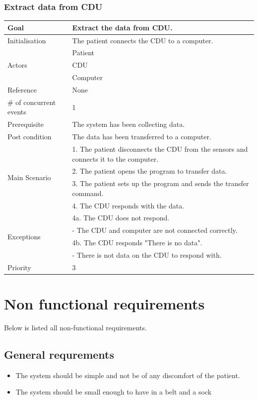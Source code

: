 \subsubsection{Extract data from CDU}
\begin{table}[H]
	\centering
	\begin{tabular}{|l|p{10cm}|}
	\hline
	Goal 							& Extract the data from CDU.\\ \hline
	Initialisation 					& The patient connects the CDU to a computer. \\ \hline
	\multirow{3}{*}{Actors} 		& Patient \\ 
									& CDU \\
									& Computer \\\hline
	Reference 						& None \\ \hline
	\# of concurrent events 		& 1 \\ \hline
	Prerequisite  					& The system has been collecting data.\\ \hline
	Post condition 					& The data has been transferred to a computer. \\ \hline
	\multirow{4}{*}{Main Scenario} 	& 1. The patient disconnects the CDU from the sensors and connects it to the computer. \\
									& 2. The patient opens the program to transfer data.\\
									& 3. The patient sets up the program and sends the transfer command.\\ 
									& 4. The CDU responds with the data. \\ \hline
	\multirow{4}{*}{Exceptions} & 4a. The CDU does not respond. \\ 
								& - The CDU and computer are not connected correctly.\\											& 4b. The CDU responds "There is no data". \\
								& - There is not data on the CDU to respond with.\\\hline
	Priority					& 3\\\hline
	\end{tabular}
\end{table}

\section{Non functional requirements}
Below is listed all non-functional requirements. \\

\subsection{General requrements}
\begin{itemize}
\item The system should be simple and not be of any discomfort of the patient.
\item The system should be small enough to have in a belt and a sock
\end{itemize}

